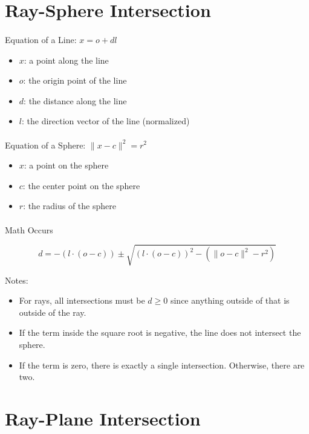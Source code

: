 \documentclass{article}
\begin{document}
\section{Ray-Sphere Intersection}

\paragraph{}
Equation of a Line: \(x = o + d l \)

\begin{itemize}
\item \(x\): a point along the line
\item \(o\): the origin point of the line
\item \(d\): the distance along the line
\item \(l\): the direction vector of the line (normalized)
\end{itemize}

\paragraph{}
Equation of a Sphere: \(\|x - c\|^2 =r^2\)

\begin{itemize}
\item \(x\): a point on the sphere
\item \(c\): the center point on the sphere
\item \(r\): the radius of the sphere
\end{itemize}


\paragraph{}
Math Occurs

\[d = -(l \cdot (o - c)) \pm \sqrt{(l \cdot (o - c))^2 - (\|o - c\|^2 - r^2)}\]

Notes:

\begin{itemize}
\item For rays, all intersections must be \(d \geq 0\) since anything outside of
  that is outside of the ray.
\item If the term inside the square root is negative, the line does not
  intersect the sphere.
\item If the term is zero, there is exactly a single intersection. Otherwise,
  there are two.
\end{itemize}

\section{Ray-Plane Intersection}
\end{document}
